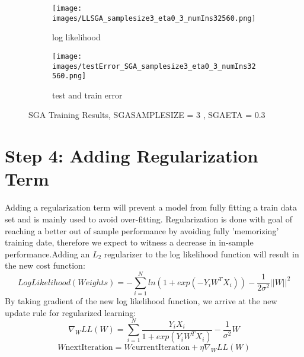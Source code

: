 \documentclass[a4paper,11pt]{article}
\begin{document}
\begin{figure}[t]

\begin{subfigure}{.5\textwidth}

  \texttt{[image: images/LLSGA\_samplesize3\_eta0\_3\_numIns32560.png]}
	\centering
  \caption{log likelihood }
  \label{fig:SGA3_loglikelihood}
\end{subfigure}
\begin{subfigure}{.5\textwidth}

  \texttt{[image: images/testError\_SGA\_samplesize3\_eta0\_3\_numIns32560.png]}
	\centering
  \caption{test and train error }
  \label{fig:SGA3_errors}
\end{subfigure}

  \caption{SGA Training Results, SGA\underline{\hspace{.2cm}}SAMPLE\underline{\hspace{.2cm}}SIZE = 3 , SGA\underline{\hspace{.2cm}}ETA = 0.3}
  \label{fig:SGA3}
\end{figure}


\section*{Step 4: Adding Regularization Term}
Adding a regularization term will prevent a model from fully fitting a train data set and is mainly used to avoid over-fitting. Regularization is done with goal of reaching a better out of sample performance by avoiding fully 'memorizing' training date, therefore we expect to witness a decrease in in-sample performance.Adding an $L_2$ regularizer to the log likelihood function will result in the new cost function:
 \begin{equation}
LogLikelihood ( Weights )  = - \sum_{i=1}^{N}ln(1+exp(-Y_iW^TX_i)) -\frac{1}{2\sigma^2} ||W||^2 
\end{equation}
By taking gradient of the new log likelihood function, we arrive at the new update rule for regularized learning:
\begin{equation}
\nabla _W LL (W) = \sum_{i=1}^{N}\frac{Y_iX_i}{1+exp(Y_iW^TX_i)} - \frac{1}{\sigma^2} W
\end{equation}
\begin{equation}
W\textrm{nextIteration} = W\textrm{currentIteration} + \eta \nabla _W LL(W)
\end{equation}
\end{document}
